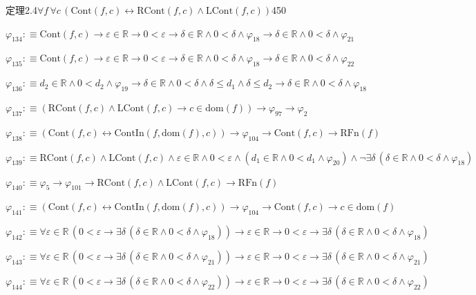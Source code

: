 \begin{fullproof}{定理2.4}{$\forall f\,\forall c\,(\mathrm{Cont}(f,c) \leftrightarrow \mathrm{RCont}(f,c) \land \mathrm{LCont}(f,c))$}{450}
\begin{abbrevlist}
\item $\varphi_{134} :\equiv \mathrm{Cont}(f,c) \to \varepsilon \in \mathbb{R} \to 0 < \varepsilon \to \delta \in \mathbb{R} \land 0 < \delta \land \varphi_{18} \to \delta \in \mathbb{R} \land 0 < \delta \land \varphi_{21}$
\item $\varphi_{135} :\equiv \mathrm{Cont}(f,c) \to \varepsilon \in \mathbb{R} \to 0 < \varepsilon \to \delta \in \mathbb{R} \land 0 < \delta \land \varphi_{18} \to \delta \in \mathbb{R} \land 0 < \delta \land \varphi_{22}$
\item $\varphi_{136} :\equiv d_{2} \in \mathbb{R} \land 0 < d_{2} \land \varphi_{19} \to \delta \in \mathbb{R} \land 0 < \delta \land \delta \leq d_{1} \land \delta \leq d_{2} \to \delta \in \mathbb{R} \land 0 < \delta \land \varphi_{18}$
\item $\varphi_{137} :\equiv (\mathrm{RCont}(f,c) \land \mathrm{LCont}(f,c) \to c \in \mathrm{dom}(f)) \to \varphi_{97} \to \varphi_{2}$
\item $\varphi_{138} :\equiv (\mathrm{Cont}(f,c) \leftrightarrow \mathrm{ContIn}(f,\mathrm{dom}(f),c)) \to \varphi_{104} \to \mathrm{Cont}(f,c) \to \mathrm{RFn}(f)$
\item $\varphi_{139} :\equiv \mathrm{RCont}(f,c) \land \mathrm{LCont}(f,c) \land \varepsilon \in \mathbb{R} \land 0 < \varepsilon \land (d_{1} \in \mathbb{R} \land 0 < d_{1} \land \varphi_{20}) \land \neg \exists \delta\,(\delta \in \mathbb{R} \land 0 < \delta \land \varphi_{18})$
\item $\varphi_{140} :\equiv \varphi_{5} \to \varphi_{101} \to \mathrm{RCont}(f,c) \land \mathrm{LCont}(f,c) \to \mathrm{RFn}(f)$
\item $\varphi_{141} :\equiv (\mathrm{Cont}(f,c) \leftrightarrow \mathrm{ContIn}(f,\mathrm{dom}(f),c)) \to \varphi_{104} \to \mathrm{Cont}(f,c) \to c \in \mathrm{dom}(f)$
\item $\varphi_{142} :\equiv \forall \varepsilon \in \mathbb{R}\,(0 < \varepsilon \to \exists \delta\,(\delta \in \mathbb{R} \land 0 < \delta \land \varphi_{18})) \to \varepsilon \in \mathbb{R} \to 0 < \varepsilon \to \exists \delta\,(\delta \in \mathbb{R} \land 0 < \delta \land \varphi_{18})$
\item $\varphi_{143} :\equiv \forall \varepsilon \in \mathbb{R}\,(0 < \varepsilon \to \exists \delta\,(\delta \in \mathbb{R} \land 0 < \delta \land \varphi_{21})) \to \varepsilon \in \mathbb{R} \to 0 < \varepsilon \to \exists \delta\,(\delta \in \mathbb{R} \land 0 < \delta \land \varphi_{21})$
\item $\varphi_{144} :\equiv \forall \varepsilon \in \mathbb{R}\,(0 < \varepsilon \to \exists \delta\,(\delta \in \mathbb{R} \land 0 < \delta \land \varphi_{22})) \to \varepsilon \in \mathbb{R} \to 0 < \varepsilon \to \exists \delta\,(\delta \in \mathbb{R} \land 0 < \delta \land \varphi_{22})$

\end{abbrevlist}
\end{fullproof}
